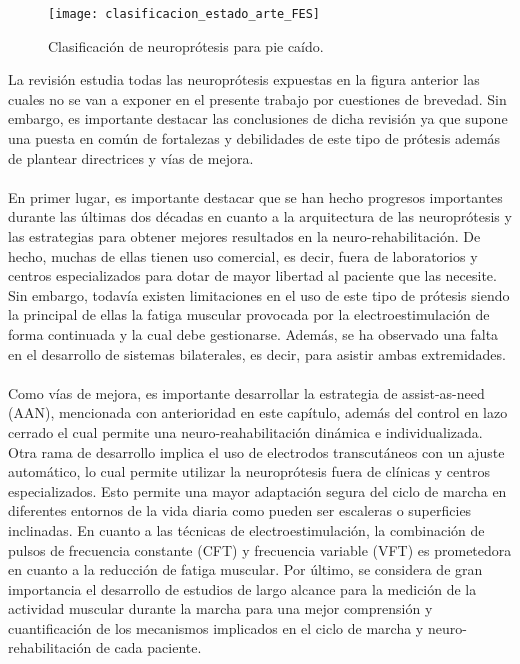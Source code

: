 \begin{figure}[!htb]
\centering
\texttt{[image: clasificacion\_estado\_arte\_FES]}
  \caption{Clasificación de neuroprótesis para pie caído\cite{estado_arte_FES}.}\label{fig:clasificacion_estado_arte_FES}
\end{figure}

La revisión estudia todas las neuroprótesis expuestas en la figura anterior las cuales no se van a exponer en el presente trabajo por cuestiones de brevedad. Sin embargo, es importante destacar las conclusiones de dicha revisión ya que supone una puesta en común de fortalezas y debilidades de este tipo de prótesis además de plantear directrices y vías de mejora. 
\\
\\
En primer lugar, es importante destacar que se han hecho progresos importantes durante las últimas dos décadas en cuanto a la arquitectura de las neuroprótesis y las estrategias para obtener mejores resultados en la neuro-rehabilitación. De hecho, muchas de ellas tienen uso comercial, es decir, fuera de laboratorios y centros especializados para dotar de mayor libertad al paciente que las necesite. Sin embargo, todavía existen limitaciones en el uso de este tipo de prótesis siendo la principal de ellas la fatiga muscular provocada por la electroestimulación de forma continuada y la cual debe gestionarse. Además, se ha observado una falta en el desarrollo de sistemas bilaterales, es decir, para asistir ambas extremidades. 
\\
\\
Como vías de mejora, es importante desarrollar la estrategia de assist-as-need (AAN), mencionada con anterioridad en este capítulo, además del control en lazo cerrado el cual permite una neuro-reahabilitación dinámica e individualizada. Otra rama de desarrollo implica el uso de electrodos transcutáneos con un ajuste automático, lo cual permite utilizar la neuroprótesis fuera de clínicas y centros especializados. Esto permite una mayor adaptación segura del ciclo de marcha en diferentes entornos de la vida diaria como pueden ser escaleras o superficies inclinadas. En cuanto a las técnicas de electroestimulación, la combinación de pulsos de frecuencia constante (CFT) y frecuencia variable (VFT) es prometedora en cuanto a la reducción de fatiga muscular. Por último, se considera de gran importancia el desarrollo de estudios de largo alcance para la medición de la actividad muscular durante la marcha para una mejor comprensión y cuantificación de los mecanismos implicados en el ciclo de marcha y neuro-rehabilitación de cada paciente.


